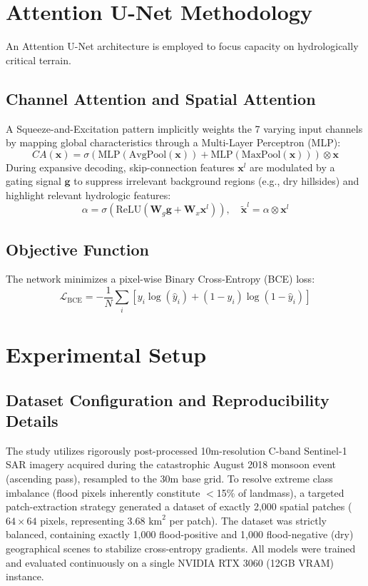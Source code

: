 \documentclass[conference]{IEEEtran}
\begin{document}
\section{Attention U-Net Methodology}
An Attention U-Net architecture \cite{11} is employed to focus capacity on hydrologically critical terrain.

\subsection{Channel Attention and Spatial Attention}
A Squeeze-and-Excitation pattern implicitly weights the 7 varying input channels by mapping global characteristics through a Multi-Layer Perceptron (MLP):
\begin{equation}
CA(\mathbf{x}) = \sigma(\text{MLP}(\text{AvgPool}(\mathbf{x})) + \text{MLP}(\text{MaxPool}(\mathbf{x}))) \otimes \mathbf{x}
\end{equation}
During expansive decoding, skip-connection features $\mathbf{x}^l$ are modulated by a gating signal $\mathbf{g}$ to suppress irrelevant background regions (e.g., dry hillsides) and highlight relevant hydrologic features:
\begin{equation}
\alpha = \sigma(\text{ReLU}(\mathbf{W}_g \mathbf{g} + \mathbf{W}_x \mathbf{x}^l)), \quad \tilde{\mathbf{x}}^l = \alpha \otimes \mathbf{x}^l
\end{equation}

\subsection{Objective Function}
The network minimizes a pixel-wise Binary Cross-Entropy (BCE) loss:
\begin{equation}
\mathcal{L}_{\text{BCE}} = -\frac{1}{N} \sum_{i} \left[ y_i \log(\hat{y}_i) + (1 - y_i)\log(1 - \hat{y}_i) \right]
\end{equation}

\section{Experimental Setup}

\subsection{Dataset Configuration and Reproducibility Details}
The study utilizes rigorously post-processed 10m-resolution C-band Sentinel-1 SAR imagery acquired during the catastrophic August 2018 monsoon event (ascending pass), resampled to the 30m base grid. To resolve extreme class imbalance (flood pixels inherently constitute $<$15\% of landmass), a targeted patch-extraction strategy generated a dataset of exactly 2,000 spatial patches ($64 \times 64$ pixels, representing 3.68 $\text{km}^2$ per patch). The dataset was strictly balanced, containing exactly 1,000 flood-positive and 1,000 flood-negative (dry) geographical scenes to stabilize cross-entropy gradients. All models were trained and evaluated continuously on a single NVIDIA RTX 3060 (12GB VRAM) instance.
\end{document}
